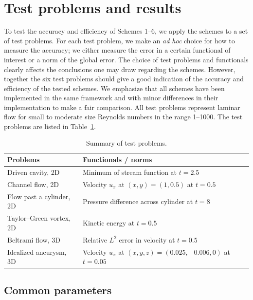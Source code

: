 \section{Test problems and results}

To test the accuracy and efficiency of Schemes 1--6, we apply the
schemes to a set of test problems. For each test problem, we make an
\emph{ad hoc} choice for how to measure the accuracy; we either
measure the error in a certain functional of interest or a norm of the
global error.  The choice of test problems and functionals clearly
affects the conclusions one may draw regarding the schemes. However,
together the six test problems should give a good indication of the
accuracy and efficiency of the tested schemes. We emphasize that all
schemes have been implemented in the same framework and with minor
differences in their implementation to make a fair comparison. All
test problems represent laminar flow for small to moderate size
Reynolds numbers in the range 1--1000. The test problems are listed in
Table~\ref{tab:problems}.

\begin{table}
  \centering
    \begin{tabular}{ll}
      \toprule
      Problems & Functionals / norms \\
      \midrule
      Driven cavity, 2D        & Minimum of stream function at $t = 2.5$ \\
      Channel flow, 2D         & Velocity $u_x$ at $(x, y) = (1, 0.5)$ at $t = 0.5$ \\
      Flow past a cylinder, 2D & Pressure difference across cylinder at $t = 8$ \\
      Taylor--Green vortex, 2D & Kinetic energy at $t = 0.5$ \\
      Beltrami flow, 3D        & Relative $L^2$ error in velocity at $t = 0.5$ \\
      Idealized aneurysm, 3D   & Velocity $u_x$ at $(x, y, z) = (0.025, -0.006, 0)$ at $t = 0.05$ \\
      \bottomrule
    \end{tabular}
  \caption{Summary of test problems.}
  \label{tab:problems}
\end{table}

\subsection{Common parameters}

